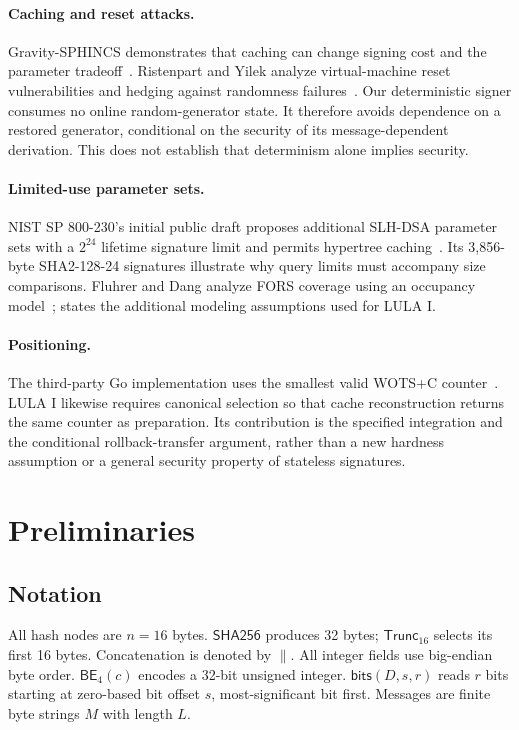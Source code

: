 \documentclass[a4paper,envcountsame,runningheads]{llncs}
\newcommand{\Hh}{\mathsf{SHA256}}
\newcommand{\Tr}{\mathsf{Trunc}_{16}}
\newcommand{\BE}{\mathsf{BE}_{4}}
\newcommand{\bits}{\mathsf{bits}}
\begin{document}
\paragraph{Caching and reset attacks.}
Gravity-SPHINCS demonstrates that caching can change signing cost and the parameter tradeoff~\cite{gravity}. Ristenpart and Yilek analyze virtual-machine reset vulnerabilities and hedging against randomness failures~\cite{reset}. Our deterministic signer consumes no online random-generator state. It therefore avoids dependence on a restored generator, conditional on the security of its message-dependent derivation. This does not establish that determinism alone implies security.

\paragraph{Limited-use parameter sets.}
NIST SP 800-230's initial public draft proposes additional SLH-DSA parameter sets with a $2^{24}$ lifetime signature limit and permits hypertree caching~\cite[Table~1 and Section~3]{sp800230}. Its 3,856-byte SHA2-128-24 signatures illustrate why query limits must accompany size comparisons. Fluhrer and Dang analyze FORS coverage using an occupancy model~\cite[Section~5]{fluhrer};  states the additional modeling assumptions used for LULA I.

\paragraph{Positioning.}
The third-party Go implementation uses the smallest valid WOTS+C counter~\cite{hashsiggo}. LULA I likewise requires canonical selection so that cache reconstruction returns the same counter as preparation. Its contribution is the specified integration and the conditional rollback-transfer argument, rather than a new hardness assumption or a general security property of stateless signatures.

\section{Preliminaries}\label{sec:preliminaries}
\subsection{Notation}\label{sec:notation}
All hash nodes are $n=16$ bytes. $\Hh$ produces 32 bytes; $\Tr$ selects its first 16 bytes. Concatenation is denoted by $\|$. All integer fields use big-endian byte order. $\BE(c)$ encodes a 32-bit unsigned integer. $\bits(D,s,r)$ reads $r$ bits starting at zero-based bit offset $s$, most-significant bit first. Messages are finite byte strings $M$ with length $L$.
\end{document}
